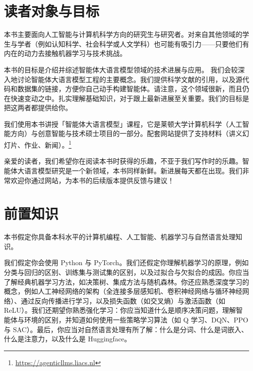 


\section{读者对象与目标}
本书主要面向人工智能与计算机科学方向的研究生与研究者。对来自其他领域的学生与学者（例如认知科学、社会科学或人文学科）也可能有吸引力——只要他们有内在的动力去接触机器学习与技术挑战。

本书的目标是介绍并综述智能体大语言模型领域的技术进展与应用。
我们会较深入地讨论智能体大语言模型工程的主要概念。我们提供科学文献的引用，以及源代码和数据集的链接，方便你自己动手构建智能体。请注意，这个领域很新，而且仍在快速变动之中。扎实理解基础知识，对于跟上最新进展至关重要。我们的目标是把这两者都提供给你。

我们使用本书讲授「智能体大语言模型」课程，它是莱顿大学计算机科学（人工智能方向）与创意智能与技术硕士项目的一部分。配套网站提供了支持材料（讲义幻灯片、作业、新闻）。\footnote{\url{https://agenticllms.liacs.nl}} 

亲爱的读者，我们希望你在阅读本书时获得的乐趣，不亚于我们写作时的乐趣。智能体大语言模型研究是一个新领域，本书同样新鲜。新进展每天都在出现。我们非常欢迎你通过网站，为本书的后续版本提供反馈与建议！

\section{前置知识}
本书假定你具备本科水平的计算机编程、人工智能、机器学习与自然语言处理知识。

我们假定你会使用 Python 与 PyTorch。我们还假定你理解机器学习的原理，例如分类与回归的区别、训练集与测试集的区别，以及过拟合与欠拟合的成因。你应当了解经典机器学习方法，如决策树、集成方法与随机森林。你还应熟悉深度学习的概念，例如人工神经网络的架构（全连接多层感知机、卷积神经网络与循环神经网络）、通过反向传播进行学习，以及损失函数（如交叉熵）与激活函数（如 ReLU）。我们还期望你熟悉强化学习：你应当知道什么是顺序决策问题，理解智能体与环境的区别，并知道如何使用一些策略学习算法（如 Q 学习、DQN、PPO 与 SAC）。最后，你应当对自然语言处理有所了解：什么是分词、什么是词嵌入、什么是注意力，以及什么是 Huggingface。

